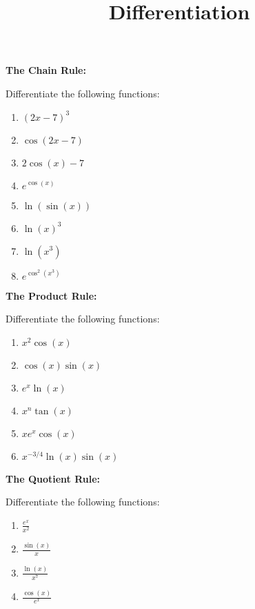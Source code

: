 \documentclass{article}
\begin{document}
\title{Differentiation}
\date{}

\maketitle
\thispagestyle{empty}

\Large





\textbf{The Chain Rule:}

\vspace{5mm}

Differentiate the following functions:


\begin{enumerate}
	\item $(2x-7)^3$
	\item $\cos(2x-7)$
	\item $2\cos(x)-7$
	\item $e^{\cos(x)}$
	\item $\ln(\sin(x))$
	\item $\ln(x)^3$
	\item $\ln(x^3)$
	\item $e^{\cos^2(x^3)}$
\end{enumerate}



\clearpage



\textbf{The Product Rule:}

\vspace{5mm}

Differentiate the following functions:

\begin{enumerate}
	\item $x^2\cos(x)$
	\item $\cos(x)\sin(x)$
	\item $e^x\ln(x)$
	\item $x^n\tan(x)$
	\item $xe^x\cos(x)$
	\item $x^{-3/4}\ln(x)\sin(x)$
\end{enumerate}



\clearpage

\textbf{The Quotient Rule:}

\vspace{5mm}

Differentiate the following functions:

\begin{enumerate}
	\item $\frac{e^x}{x^2}$
	\item $\frac{\sin(x)}{x}$
	\item $\frac{\ln(x)}{x^7}$
	\item $\frac{\cos(x)}{e^x}$
\end{enumerate}
\end{document}
